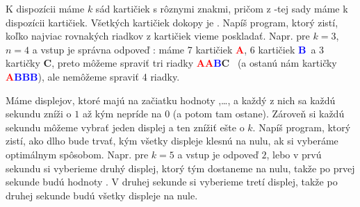 
\begin{uloha}
  \def\tmpA{\textcolor{red}{{\bfseries A}}}
  \def\tmpB{\textcolor{blue}{{\bfseries B}}}
  \def\tmpC{\textcolor{green!50!black}{{\bfseries C}}}
  K dispozícii máme $k$ sád kartičiek s rôznymi znakmi, pričom z -tej
  sady máme k dispozícii  kartičiek. Všetkých kartičiek dokopy je .
  Napíš program, ktorý zistí, koľko najviac rovnakých riadkov z kartičiek vieme poskladať.
  Napr. pre $k=3$, $n=4$ a vstup  je správna odpoveď : máme
  7 kartičiek \tmpA, 6 kartičiek \tmpB~a 3 kartičky \tmpC, preto môžeme spraviť
  tri riadky \tmpA\tmpA\tmpB\tmpC~ (a ostanú nám kartičky \tmpA\tmpB\tmpB\tmpB), 
  ale
  nemôžeme spraviť 4 riadky.
\end{uloha}

\begin{uloha}
  Máme  displejov, ktoré majú na začiatku hodnoty ,\ldots,
  a každý z nich sa každú sekundu zníži o $1$ až kým nepríde na $0$ (a potom tam ostane).
  Zároveň si každú sekundu môžeme vybrať jeden displej a ten znížiť ešte o $k$.
  Napíš program, ktorý zistí, ako dlho bude trvať, kým všetky displeje klesnú na nulu,
  ak si vyberáme optimálnym spôsobom. Napr. pre $k=5$ a vstup  je odpoveď
  $2$, lebo v prvú sekundu si vyberieme druhý displej, ktorý tým dostaneme na nulu,
  takže po prvej sekunde budú hodnoty . V druhej sekunde si vyberieme 
  tretí displej, takže po druhej sekunde budú všetky displeje na nule.
\end{uloha}

